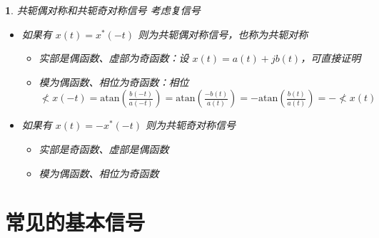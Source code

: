 \documentclass[UTF8]{report}
\theoremstyle{MyLineTheoremStyle} %
\theoremstyle{MyBlockTheoremStyle} %
\theoremstyle{MySubsubsectionStyle} %
\newtheorem{definition}{}
\begin{document}
\begin{definition}
    共轭偶对称和共轭奇对称信号
考虑复信号
\begin{itemize}
    \item 如果有 $x(t) = x^*(-t)$ 则为共轭偶对称信号，也称为共轭对称
    \begin{itemize}
        \item 实部是偶函数、虚部为奇函数：设 $x(t) = a(t) + jb(t)$，可直接证明
        \item 模为偶函数、相位为奇函数：相位 $\nless x(-t) = \text{atan} \left( \frac{b(-t)}{a(-t)} \right) = \text{atan} \left( \frac{-b(t)}{a(t)} \right) = -\text{atan} \left( \frac{b(t)}{a(t)} \right) = -\nless x(t)$
    \end{itemize}
    \item 如果有 $x(t) = -x^*(-t)$ 则为共轭奇对称信号
    \begin{itemize}
        \item 实部是奇函数、虚部是偶函数
        \item 模为偶函数、相位为奇函数
    \end{itemize}
\end{itemize}
\end{definition}

\section{常见的基本信号}
\end{document}
